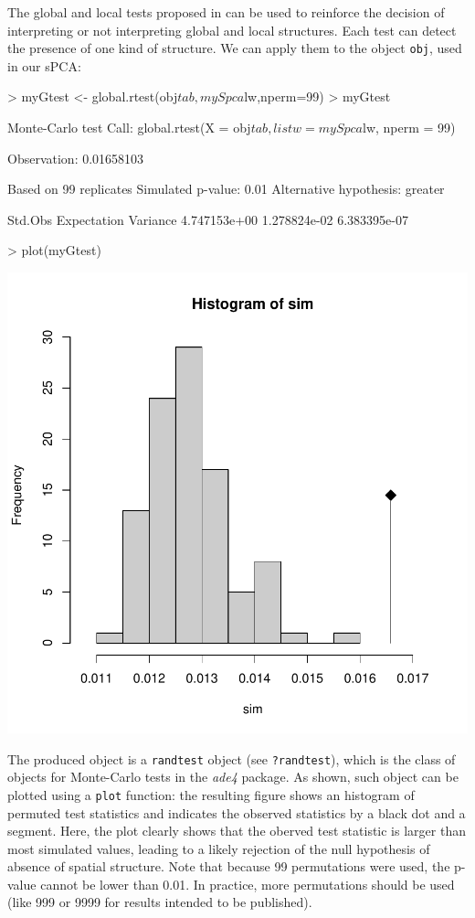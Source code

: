 \documentclass{article}
\begin{document}
The global and local tests proposed in \cite{tjart04} can
be used to reinforce the decision of interpreting or not
interpreting global and local structures.
Each test can detect the presence of one kind of structure.
We can apply them to the object \texttt{obj}, used in our sPCA:
\begin{Schunk}
\begin{Sinput}
> myGtest <- global.rtest(obj$tab,mySpca$lw,nperm=99)
> myGtest
\end{Sinput}
\begin{Soutput}
Monte-Carlo test
Call: global.rtest(X = obj$tab, listw = mySpca$lw, nperm = 99)

Observation: 0.01658103 

Based on 99 replicates
Simulated p-value: 0.01 
Alternative hypothesis: greater 

     Std.Obs  Expectation     Variance 
4.747153e+00 1.278824e-02 6.383395e-07 
\end{Soutput}
\begin{Sinput}
> plot(myGtest)
\end{Sinput}
\end{Schunk}
\includegraphics{spca-globalrtest}

\noindent The produced object is a \texttt{randtest} object (see
\texttt{?randtest}), which is the class of objects for Monte-Carlo
tests in the \textit{ade4} package.
As shown, such object can be plotted using a \texttt{plot} function:
the resulting figure shows an histogram of permuted test statistics
and indicates the observed statistics by a black dot and a segment.
Here, the plot clearly shows that the oberved test statistic is larger
than most simulated values, leading to a likely rejection of
the null hypothesis of absence of spatial structure.
Note that because 99 permutations were used, the p-value cannot be
lower than 0.01.
In practice, more permutations should be used (like 999 or 9999 for results
intended to be published).
\end{document}
